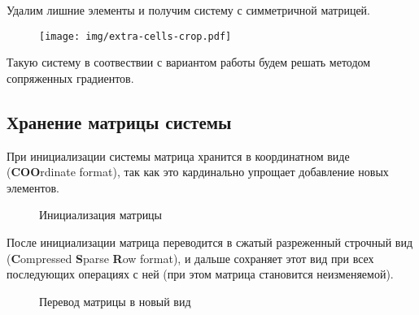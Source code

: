 Удалим лишние элементы и получим систему с симметричной матрицей.
\begin{figure}[H]
    \centering
    \texttt{[image: img/extra-cells-crop.pdf]}
\end{figure}
Такую систему в соотвествии с вариантом работы будем решать методом сопряженных градиентов.

\subsection{Хранение матрицы системы}
При инициализации системы матрица хранится в координатном виде (\textbf{COO}rdinate format),
так как это кардинально упрощает добавление новых элементов.
\begin{figure}[H]
    \centering
    \caption{Инициализация матрицы}
\end{figure}
После инициализации матрица переводится в сжатый разреженный строчный вид (\textbf{C}ompressed \textbf{S}parse \textbf{R}ow format),
и дальше сохраняет этот вид при всех последующих операциях с ней (при этом матрица становится неизменяемой).
\begin{figure}[H]
    \centering
    \caption{Перевод матрицы в новый вид}
\end{figure}